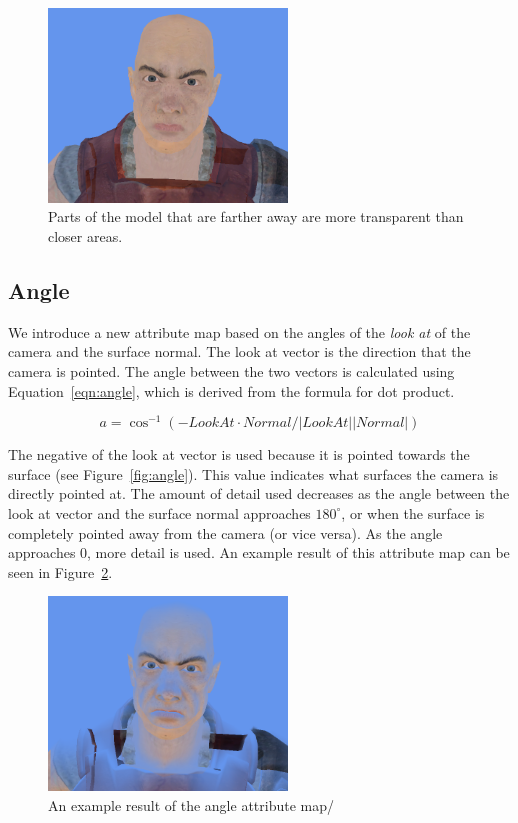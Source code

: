 \documentclass[annual]{acmsiggraph}
\begin{document}
\begin{figure}[h]
	\centering
	\includegraphics[width=2.5in]{images/distance_result}
	\caption{Parts of the model that are farther away are more transparent than closer areas.}
	\label{fig:distanceResult}
\end{figure}

\subsection{Angle}
We introduce a new attribute map based on the angles of the {\it{look at}} of the camera and the surface normal. The look at vector is the direction that the camera is pointed. The angle between the two vectors is calculated using Equation~\ref{eqn:angle}, which is derived from the formula for dot product.

\begin{equation}
\label{eqn:angle}
a = \cos^{-1}{(-LookAt \cdot Normal / |LookAt||Normal|)}
\end{equation}

The negative of the look at vector is used because it is pointed towards the surface (see Figure~\ref{fig:angle}). This value indicates what surfaces the camera is directly pointed at. The amount of detail used decreases as the angle between the look at vector and the surface normal approaches $180^\circ$, or when the surface is completely pointed away from the camera (or vice versa). As the angle approaches 0, more detail is used. An example result of this attribute map can be seen in Figure~\ref{fig:angleResult}.

\begin{figure}[h]
	\centering
	\includegraphics[width=2.5in]{images/angle_result}
	\caption{An example result of the angle attribute map/}
	\label{fig:angleResult}
\end{figure}
\end{document}
